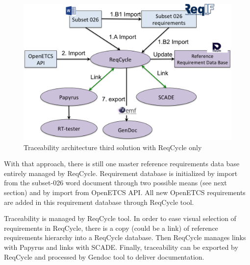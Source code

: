 \documentclass[11pt]{template/openetcs_report}
\begin{document}
\begin{figure}[htb]
\centering
\includegraphics[width=.9\linewidth]{images/Third-Solution-ReqCycle.png}
\caption{\label{fig:trace_third}Traceability architecture third solution with ReqCycle only}
\end{figure}

With that approach, there is still one master reference requirements data base entirely managed by ReqCycle. Requirement database is initialized by import from the subset-026 word document through two possible means (see next section) and by import from OpenETCS API.
All new OpenETCS requirements are added in this requirement database through ReqCycle tool.

Traceability is managed by ReqCycle tool. In order to ease visual selection of requirements in ReqCycle, there is a copy (could be a link) of reference requirements hierarchy into a ReqCycle database. Then ReqCycle manages links with Papyrus and links with SCADE. 
Finally, traceability can be exported by ReqCycle and processed by Gendoc tool to deliver documentation.













%
%






\end{document}
